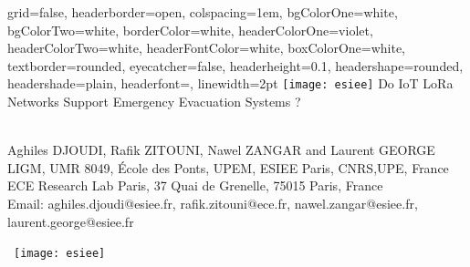 \begin{poster}{
    grid=false,
    headerborder=open,           %
    colspacing=1em,              %
    bgColorOne=white,            %
    bgColorTwo=white,            %
    borderColor=white,           %
    headerColorOne=violet,       %
    headerColorTwo=white,        %
    headerFontColor=white,       %
    boxColorOne=white,           %
    textborder=rounded,          %
    eyecatcher=false,            %
    headerheight=0.1\textheight, %
    headershape=rounded,         %
    headershade=plain,
    headerfont=\Large\textsf,    %
    linewidth=2pt                %
}{
    \texttt{[image: esiee]}
}{
   \LARGE\textsf{Do IoT LoRa Networks Support Emergency Evacuation Systems ?}
}{
    \sf\vspace{0.2em}\\
    Aghiles DJOUDI, Rafik ZITOUNI, Nawel ZANGAR and Laurent GEORGE
    \vspace{0.3em}\\
    \small{
         LIGM, UMR 8049, École des Ponts, UPEM, ESIEE Paris, CNRS,UPE, France\\
         ECE Research Lab Paris, 37 Quai de Grenelle, 75015 Paris, France
        \vspace{0.3em}\\
    }
    Email:   aghiles.djoudi@esiee.fr, rafik.zitouni@ece.fr, nawel.zangar@esiee.fr, laurent.george@esiee.fr

}{
	\
    \texttt{[image: esiee]}
}


\end{poster}
